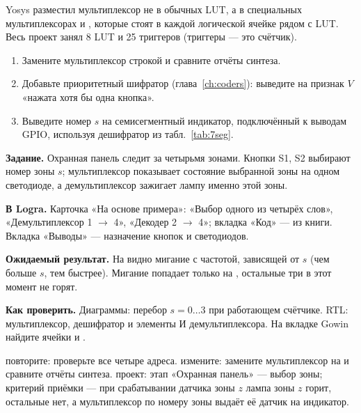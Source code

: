\begin{infobox}
Yosys разместил мультиплексор не в обычных LUT, а в специальных
мультиплексорах  и , которые стоят в каждой
логической ячейке рядом с LUT. Весь проект занял 8 LUT и 25 триггеров
(триггеры --- это счётчик).
\end{infobox}

\begin{taskbox}
\begin{enumerate}
  \item Замените мультиплексор строкой  и сравните
        отчёты синтеза.
  \item Добавьте приоритетный шифратор (глава~\ref{ch:coders}): выведите на
         признак $V$ «нажата хотя бы одна кнопка».
  \item Выведите номер $s$ на семисегментный индикатор, подключённый к
        выводам GPIO, используя дешифратор из табл.~\ref{tab:7seg}.
\end{enumerate}
\end{taskbox}

\begin{diybox}
\textbf{Задание.} Охранная панель следит за четырьмя зонами. Кнопки S1, S2 выбирают номер зоны $s$; мультиплексор показывает состояние выбранной зоны на одном светодиоде, а демультиплексор зажигает лампу именно этой зоны.

\textbf{В Logra.} Карточка «На основе примера»: «Выбор одного из четырёх слов», «Демультиплексор 1 $\to$ 4», «Декодер 2 $\to$ 4»; вкладка «Код» ---  из книги. Вкладка «Выводы» --- назначение кнопок и светодиодов.

\textbf{Ожидаемый результат.} На  видно мигание с частотой, зависящей от $s$ (чем больше $s$, тем быстрее). Мигание попадает только на , остальные три в этот момент не горят.

\textbf{Как проверить.} Диаграммы: перебор $s=0\ldots3$ при работающем счётчике. RTL: мультиплексор, дешифратор и элементы И демультиплексора. На вкладке Gowin найдите ячейки  и .

 повторите: проверьте все четыре адреса.  измените: замените мультиплексор на  и сравните отчёты синтеза.  проект: этап «Охранная панель» --- выбор зоны; критерий приёмки --- при срабатывании датчика зоны $z$ лампа зоны $z$ горит, остальные нет, а мультиплексор по номеру зоны выдаёт её датчик на индикатор.
\end{diybox}
